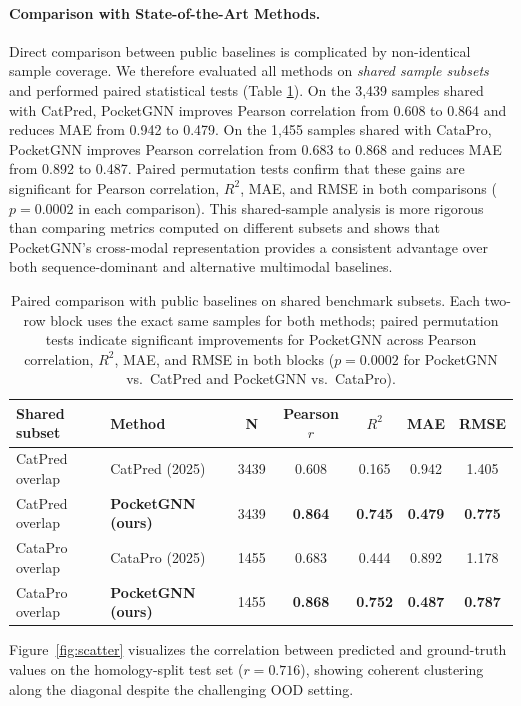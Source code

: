 \documentclass[11pt]{article}
\begin{document}
\paragraph{Comparison with State-of-the-Art Methods.}
Direct comparison between public baselines is complicated by non-identical sample coverage. We therefore evaluated all methods on \emph{shared sample subsets} and performed paired statistical tests (Table \ref{tab:sota_comparison}). On the 3,439 samples shared with CatPred, PocketGNN improves Pearson correlation from 0.608 to 0.864 and reduces MAE from 0.942 to 0.479. On the 1,455 samples shared with CataPro, PocketGNN improves Pearson correlation from 0.683 to 0.868 and reduces MAE from 0.892 to 0.487. Paired permutation tests confirm that these gains are significant for Pearson correlation, $R^2$, MAE, and RMSE in both comparisons ($p=0.0002$ in each comparison). This shared-sample analysis is more rigorous than comparing metrics computed on different subsets and shows that PocketGNN's cross-modal representation provides a consistent advantage over both sequence-dominant and alternative multimodal baselines.

\begin{table}[h]
\centering
\caption{Paired comparison with public baselines on shared benchmark subsets. Each two-row block uses the exact same samples for both methods; paired permutation tests indicate significant improvements for PocketGNN across Pearson correlation, $R^2$, MAE, and RMSE in both blocks ($p=0.0002$ for PocketGNN vs.\ CatPred and PocketGNN vs.\ CataPro).}
\label{tab:sota_comparison}
\begin{tabular}{llccccc}
\toprule
Shared subset & Method & N & Pearson $r$ & $R^2$ & MAE & RMSE \\
\midrule
CatPred overlap & CatPred (2025)~\citep{catpred} & 3439 & 0.608 & 0.165 & 0.942 & 1.405 \\
CatPred overlap & \textbf{PocketGNN (ours)} & 3439 & \textbf{0.864} & \textbf{0.745} & \textbf{0.479} & \textbf{0.775} \\
\midrule
CataPro overlap & CataPro (2025)~\citep{catapro} & 1455 & 0.683 & 0.444 & 0.892 & 1.178 \\
CataPro overlap & \textbf{PocketGNN (ours)} & 1455 & \textbf{0.868} & \textbf{0.752} & \textbf{0.487} & \textbf{0.787} \\
\bottomrule
\end{tabular}
\end{table}

Figure~\ref{fig:scatter} visualizes the correlation between predicted and ground-truth values on the homology-split test set ($r=0.716$), showing coherent clustering along the diagonal despite the challenging OOD setting.
\end{document}
